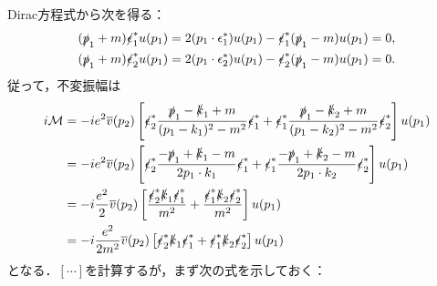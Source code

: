 Dirac方程式から次を得る：
\begin{align*}
  (\slashed{p}_1 + m) \slashed{\epsilon}_1^\ast u(p_1) &= 2 (p_1 \cdot \epsilon_1^\ast) u(p_1) - \slashed{\epsilon}_1^\ast (\slashed{p}_1 - m) u(p_1) =0 , \\
  (\slashed{p}_1 + m) \slashed{\epsilon}_2^\ast u(p_1) &= 2 (p_1 \cdot \epsilon_2^\ast) u(p_1) - \slashed{\epsilon}_2^\ast (\slashed{p}_1 - m) u(p_1) = 0 .
\end{align*}
従って，不変振幅は
\begin{align}
  \begin{split}
    i\mathcal{M} &= -ie^2 \overline{v}(p_2) \left[ \slashed{\epsilon}_2^\ast \frac{\slashed{p}_1 - \slashed{k}_1 + m}{(p_1 - k_1)^2 - m^2} \slashed{\epsilon}_1^\ast
    + \slashed{\epsilon}_1^\ast \frac{\slashed{p}_1 - \slashed{k}_2 + m}{(p_1 - k_2)^2 - m^2} \slashed{\epsilon}_2^\ast \right] u(p_1) \\
    &= -ie^2 \overline{v}(p_2) \left[ \slashed{\epsilon}_2^\ast \frac{-\slashed{p}_1 + \slashed{k}_1 - m}{2p_1 \cdot k_1} \slashed{\epsilon}_1^\ast
    + \slashed{\epsilon}_1^\ast \frac{-\slashed{p}_1 + \slashed{k}_2 - m}{2p_1 \cdot k_2} \slashed{\epsilon}_2^\ast \right] u(p_1) \\
    &= -i\frac{e^2}{2} \overline{v}(p_2) \left[
    \frac{\slashed{\epsilon}_2^\ast\slashed{k}_1\slashed{\epsilon}_1^\ast}{m^2}
    + \frac{\slashed{\epsilon}_1^\ast\slashed{k}_2\slashed{\epsilon}_2^\ast}{m^2}
    \right] u(p_1) \\
    &= -i\frac{e^2}{2m^2} \overline{v}(p_2) \left[
    \slashed{\epsilon}_2^\ast\slashed{k}_1\slashed{\epsilon}_1^\ast +\slashed{\epsilon}_1^\ast\slashed{k}_2\slashed{\epsilon}_2^\ast
    \right] u(p_1)
  \end{split}
  \label{prob5_4a_iM}
\end{align}
となる．$[\cdots]$を計算するが，まず次の式を示しておく：
